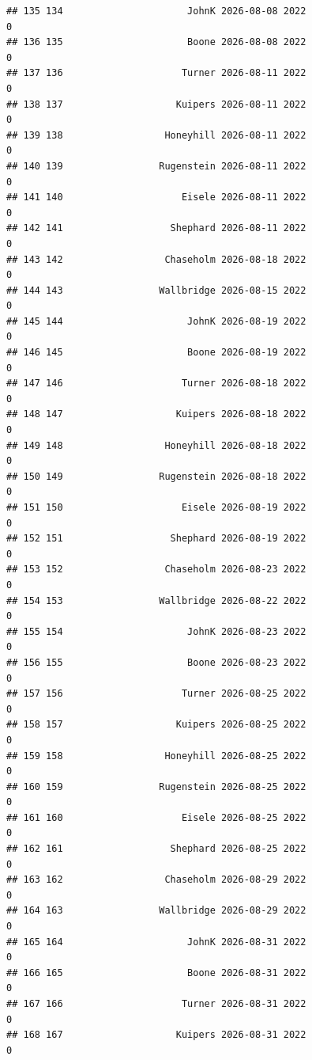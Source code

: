 \documentclass[
]{article}
\begin{document}
\begin{verbatim}
## 135 134                      JohnK 2026-08-08 2022                       0
## 136 135                      Boone 2026-08-08 2022                       0
## 137 136                     Turner 2026-08-11 2022                       0
## 138 137                    Kuipers 2026-08-11 2022                       0
## 139 138                  Honeyhill 2026-08-11 2022                       0
## 140 139                 Rugenstein 2026-08-11 2022                       0
## 141 140                     Eisele 2026-08-11 2022                       0
## 142 141                   Shephard 2026-08-11 2022                       0
## 143 142                  Chaseholm 2026-08-18 2022                       0
## 144 143                 Wallbridge 2026-08-15 2022                       0
## 145 144                      JohnK 2026-08-19 2022                       0
## 146 145                      Boone 2026-08-19 2022                       0
## 147 146                     Turner 2026-08-18 2022                       0
## 148 147                    Kuipers 2026-08-18 2022                       0
## 149 148                  Honeyhill 2026-08-18 2022                       0
## 150 149                 Rugenstein 2026-08-18 2022                       0
## 151 150                     Eisele 2026-08-19 2022                       0
## 152 151                   Shephard 2026-08-19 2022                       0
## 153 152                  Chaseholm 2026-08-23 2022                       0
## 154 153                 Wallbridge 2026-08-22 2022                       0
## 155 154                      JohnK 2026-08-23 2022                       0
## 156 155                      Boone 2026-08-23 2022                       0
## 157 156                     Turner 2026-08-25 2022                       0
## 158 157                    Kuipers 2026-08-25 2022                       0
## 159 158                  Honeyhill 2026-08-25 2022                       0
## 160 159                 Rugenstein 2026-08-25 2022                       0
## 161 160                     Eisele 2026-08-25 2022                       0
## 162 161                   Shephard 2026-08-25 2022                       0
## 163 162                  Chaseholm 2026-08-29 2022                       0
## 164 163                 Wallbridge 2026-08-29 2022                       0
## 165 164                      JohnK 2026-08-31 2022                       0
## 166 165                      Boone 2026-08-31 2022                       0
## 167 166                     Turner 2026-08-31 2022                       0
## 168 167                    Kuipers 2026-08-31 2022                       0

\end{verbatim}
\end{document}
